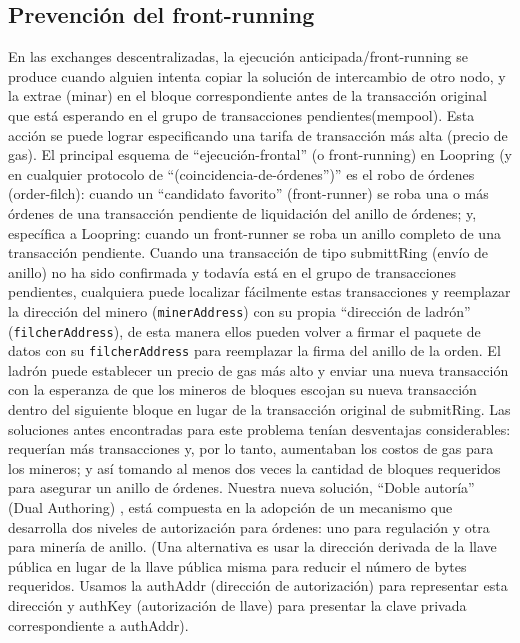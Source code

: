 \documentclass[UTF8,nofonts]{article}
\begin{document}
\begin{multicols}{2}
\subsection{Prevenci\'on del front-running\label{sec:dual_authoring}}
En las exchanges descentralizadas, la ejecuci\'on anticipada/front-running se produce cuando alguien intenta copiar la soluci\'on de intercambio de otro nodo, y la extrae (minar)  en el bloque correspondiente antes de la transacci\'on original que est\'a esperando en el grupo de transacciones pendientes(mempool). Esta acci\'on se puede lograr especificando una tarifa de transacci\'on m\'as alta (precio de gas). El principal esquema de \enquote{ejecuci\'on-frontal} (o front-running) en Loopring (y en cualquier protocolo de \enquote{(coincidencia-de-\'ordenes”)} es el robo de \'ordenes (order-filch): cuando un “candidato favorito” (front-runner) se roba una o m\'as \'ordenes de una transacci\'on pendiente de liquidaci\'on del anillo de \'ordenes; y, espec\'ifica a Loopring: cuando un front-runner se roba un anillo completo de una transacci\'on pendiente. 
Cuando una transacci\'on de tipo submittRing (env\'io de anillo) no ha sido confirmada y todav\'ia est\'a en el grupo de transacciones pendientes, cualquiera puede localizar f\'acilmente estas transacciones y reemplazar la direcci\'on del minero (\verb|minerAddress|) con su propia \enquote{direcci\'on de ladr\'on} (\verb|filcherAddress|), de esta manera ellos pueden volver a firmar el paquete de datos con su \verb|filcherAddress| para reemplazar la firma del anillo de la orden. El ladr\'on puede establecer un precio de gas m\'as alto y enviar una nueva transacci\'on con la esperanza de que los mineros de bloques escojan su nueva transacci\'on dentro del siguiente bloque en lugar de la transacci\'on original de submitRing.
Las soluciones antes encontradas para este problema ten\'ian desventajas considerables: requer\'ian m\'as transacciones y, por lo tanto, aumentaban los costos de gas para los mineros; y as\'i tomando al menos dos veces la cantidad de bloques requeridos para asegurar un anillo de \'ordenes. Nuestra nueva soluci\'on, \enquote{Doble autor\'ia} (Dual Authoring) \cite{dualauthor}, est\'a compuesta en la adopci\'on de un mecanismo que desarrolla dos niveles de autorizaci\'on para \'ordenes: uno para regulaci\'on y otra para miner\'ia de anillo. (Una alternativa es usar la direcci\'on derivada de la llave p\'ublica en lugar de la llave p\'ublica misma para reducir el n\'umero de bytes requeridos. Usamos la authAddr (direcci\'on de autorizaci\'on) para representar esta direcci\'on y authKey (autorizaci\'on de llave) para presentar la clave privada correspondiente a authAddr).


\end{multicols}
\end{document}
